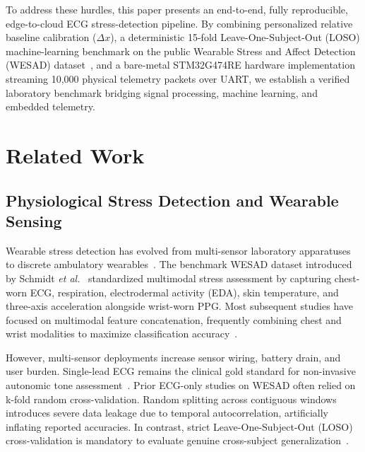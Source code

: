 \documentclass[conference]{IEEEtran}
\begin{document}
To address these hurdles, this paper presents an end-to-end, fully reproducible, edge-to-cloud ECG stress-detection pipeline. By combining personalized relative baseline calibration ($\Delta x$), a deterministic 15-fold Leave-One-Subject-Out (LOSO) machine-learning benchmark on the public Wearable Stress and Affect Detection (WESAD) dataset~\cite{schmidt2018wesad}, and a bare-metal STM32G474RE hardware implementation streaming 10,000 physical telemetry packets over UART, we establish a verified laboratory benchmark bridging signal processing, machine learning, and embedded telemetry.

\section{Related Work}
\label{sec:related_work}

\subsection{Physiological Stress Detection and Wearable Sensing}
Wearable stress detection has evolved from multi-sensor laboratory apparatuses to discrete ambulatory wearables~\cite{healey2005detecting,plarre2011continuous}. The benchmark WESAD dataset introduced by Schmidt \textit{et al.}~\cite{schmidt2018wesad} standardized multimodal stress assessment by capturing chest-worn ECG, respiration, electrodermal activity (EDA), skin temperature, and three-axis acceleration alongside wrist-worn PPG. Most subsequent studies have focused on multimodal feature concatenation, frequently combining chest and wrist modalities to maximize classification accuracy~\cite{can2019continuous}. 

However, multi-sensor deployments increase sensor wiring, battery drain, and user burden. Single-lead ECG remains the clinical gold standard for non-invasive autonomic tone assessment~\cite{clifford2006advanced,tarvainen2014kubios}. Prior ECG-only studies on WESAD often relied on k-fold random cross-validation. Random splitting across contiguous windows introduces severe data leakage due to temporal autocorrelation, artificially inflating reported accuracies. In contrast, strict Leave-One-Subject-Out (LOSO) cross-validation is mandatory to evaluate genuine cross-subject generalization~\cite{schmidt2018wesad}.
\end{document}

